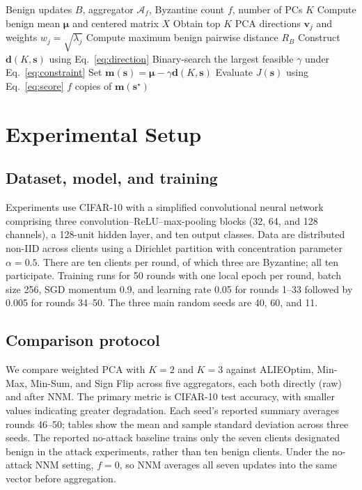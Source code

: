 \documentclass[11pt,a4paper]{article}
\newcommand{\mean}{\boldsymbol{\mu}}
\newcommand{\mal}{\boldsymbol{m}}
\newcommand{\dir}{\boldsymbol{d}}
\newcommand{\agg}{\mathcal{A}}
\begin{document}
\begin{algorithm}[t]
\caption{Weighted PCA attack at one communication round}
\begin{algorithmic}[1]
\Require Benign updates $B$, aggregator $\agg_f$, Byzantine count $f$, number of PCs $K$
\State Compute benign mean $\mean$ and centered matrix $X$
\State Obtain top $K$ PCA directions $\boldsymbol{v}_j$ and weights $w_j=\sqrt{\lambda_j}$
\State Compute maximum benign pairwise distance $R_B$
  \State Construct $\dir(K,\boldsymbol{s})$ using Eq.~\eqref{eq:direction}
  \State Binary-search the largest feasible $\gamma$ under Eq.~\eqref{eq:constraint}
  \State Set $\mal(\boldsymbol{s})=\mean-\gamma\dir(K,\boldsymbol{s})$
  \State Evaluate $J(\boldsymbol{s})$ using Eq.~\eqref{eq:score}
\EndFor
\State \Return $f$ copies of $\mal(\boldsymbol{s}^{\star})$
\end{algorithmic}
\end{algorithm}

\section{Experimental Setup}
\subsection{Dataset, model, and training}
Experiments use CIFAR-10 with a simplified convolutional neural network comprising three convolution--ReLU--max-pooling blocks (32, 64, and 128 channels), a 128-unit hidden layer, and ten output classes. Data are distributed non-IID across clients using a Dirichlet partition with concentration parameter $\alpha=0.5$. There are ten clients per round, of which three are Byzantine; all ten participate. Training runs for 50 rounds with one local epoch per round, batch size 256, SGD momentum 0.9, and learning rate 0.05 for rounds 1--33 followed by 0.005 for rounds 34--50. The three main random seeds are 40, 60, and 11.

\subsection{Comparison protocol}
We compare weighted PCA with $K=2$ and $K=3$ against ALIEOptim, Min-Max, Min-Sum, and Sign Flip across five aggregators, each both directly (raw) and after NNM. The primary metric is CIFAR-10 test accuracy, with smaller values indicating greater degradation. Each seed's reported summary averages rounds 46--50; tables show the mean and sample standard deviation across three seeds. The reported no-attack baseline trains only the seven clients designated benign in the attack experiments, rather than ten benign clients. Under the no-attack NNM setting, $f=0$, so NNM averages all seven updates into the same vector before aggregation.
\end{document}
